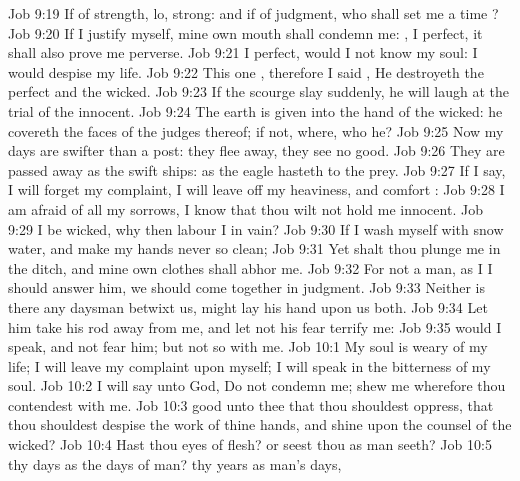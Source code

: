\vs Job 9:19 If  of strength, lo,  strong: and if of judgment, who shall set me a time ?
\vs Job 9:20 If I justify myself, mine own mouth shall condemn me: , I  perfect, it shall also prove me perverse.
\vs Job 9:21  I  perfect,  would I not know my soul: I would despise my life.
\vs Job 9:22 This  one , therefore I said , He destroyeth the perfect and the wicked.
\vs Job 9:23 If the scourge slay suddenly, he will laugh at the trial of the innocent.
\vs Job 9:24 The earth is given into the hand of the wicked: he covereth the faces of the judges thereof; if not, where,  who  he?
\vs Job 9:25 Now my days are swifter than a post: they flee away, they see no good.
\vs Job 9:26 They are passed away as the swift ships: as the eagle  hasteth to the prey.
\vs Job 9:27 If I say, I will forget my complaint, I will leave off my heaviness, and comfort :
\vs Job 9:28 I am afraid of all my sorrows, I know that thou wilt not hold me innocent.
\vs Job 9:29  I be wicked, why then labour I in vain?
\vs Job 9:30 If I wash myself with snow water, and make my hands never so clean;
\vs Job 9:31 Yet shalt thou plunge me in the ditch, and mine own clothes shall abhor me.
\vs Job 9:32 For  not a man, as I  I should answer him,  we should come together in judgment.
\vs Job 9:33 Neither is there any daysman betwixt us,  might lay his hand upon us both.
\vs Job 9:34 Let him take his rod away from me, and let not his fear terrify me:
\vs Job 9:35  would I speak, and not fear him; but  not so with me.
\vs Job 10:1 My soul is weary of my life; I will leave my complaint upon myself; I will speak in the bitterness of my soul.
\vs Job 10:2 I will say unto God, Do not condemn me; shew me wherefore thou contendest with me.
\vs Job 10:3  good unto thee that thou shouldest oppress, that thou shouldest despise the work of thine hands, and shine upon the counsel of the wicked?
\vs Job 10:4 Hast thou eyes of flesh? or seest thou as man seeth?
\vs Job 10:5  thy days as the days of man?  thy years as man's days,
